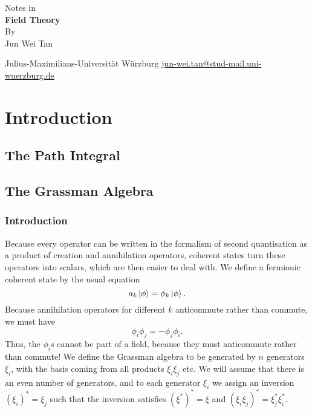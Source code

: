 \documentclass[twoside,symmetric, openany, 12pt]{./tuftebook}
\theoremstyle{definition}
\theoremstyle{definition}
\theoremstyle{definition}
\begin{document}
	\begin{titlepage}
		{\begingroup%
			\centering
			{\Large Notes in}\\[\baselineskip]
			{\Huge\bfseries Field Theory}\\[\baselineskip]
			{\LARGE By}\\[\baselineskip]
			{\LARGE Jun Wei Tan}\par
			\vfill
			{Julius-Maximilians-Universit\"{a}t W\"{u}rzburg}
			\vfill
			{\small\sffamily \href{mailto:jun-wei.tan@stud-mail.uni-wuerzburg.de}{jun-wei.tan@stud-mail.uni-wuerzburg.de}}\par
			\endgroup}
	\end{titlepage}
	\restoregeometry
	\tableofcontents

	\chapter{Introduction}
	\section{The Path Integral}

	\section{The Grassman Algebra}
	\subsection{Introduction}
	Because every operator can be written in the formalism of second quantisation as a product of creation and annihilation operators, coherent states turn these operators into scalars, which are then easier to deal with. We define a fermionic coherent state by the usual equation
	\[
		a_k \ket{\phi} = \phi_k \ket{\phi}
	.\] 
	Because annihilation operators for different $k$ anticommute rather than commute, we must have
	\[
	\phi_i \phi_j = -\phi_j\phi_i
	.\] 
	Thus, the $\phi_i$s cannot be part of a field, because they must anticommute rather than commute! We define the Grassman algebra to be generated by $n$ generators $\xi_i$, with the basis coming from all products $\xi_i\xi_j$ etc. We will assume that there is an even number of generators, and to each generator $\xi_i$ we assign an inversion $(\xi_i)^* = \xi_j$ such that the inversion satisfies $(\xi^*)^* = \xi$ and $(\xi_i\xi_j)^* = \xi_j^*\xi_i^*$. 
\end{document}
